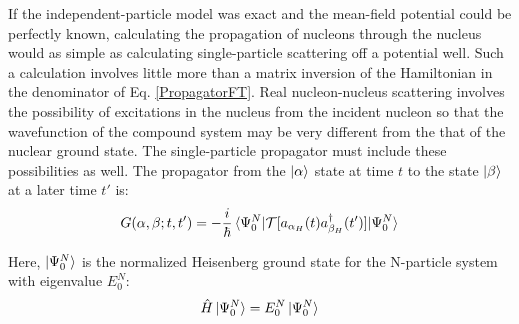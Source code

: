 \noindent
If the independent-particle model was exact and the mean-field potential could be perfectly known,
calculating the propagation of nucleons through the nucleus would as simple as calculating
single-particle scattering off a potential well. Such a calculation involves little more than
a matrix inversion of the Hamiltonian in the denominator of Eq. \ref{PropagatorFT}.
Real nucleon-nucleus scattering involves the possibility of excitations in the nucleus from the 
incident
nucleon so that the wavefunction of the compound system may be
very different from the that of the nuclear ground state.
The single-particle propagator must include these possibilities as well.
The propagator from the $\ket{\alpha}$ state at time $t$ to the state $\ket{\beta}$ at a later time
$t'$ is:
\begin{equation} \label{ManyBodySPPropagator}
    G(\alpha, \beta; t, t') =
    -\frac{i}{\hbar}\braket{\Psi^{N}_{0}|\mathcal{T}
    [a_{\alpha_{H}}(t)a^{\dagger}_{\beta_{H}}(t')]|\Psi^{N}_{0}}
\end{equation}

\noindent
Here, $\ket{\Psi^{N}_{0}}$ is the normalized Heisenberg ground state for the N-particle system with
eigenvalue $E^{N}_{0}$:
\begin{equation} \label{NParticleGroundState}
    \hat{H}\ket{\Psi^{N}_{0}} = E^{N}_{0}\ket{\Psi^{N}_{0}}
\end{equation}

